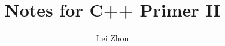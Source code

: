 \documentclass{article}
\begin{document}
\title{Notes for C++ Primer II}
\author{Lei Zhou}
\maketitle

%


\end{document}
